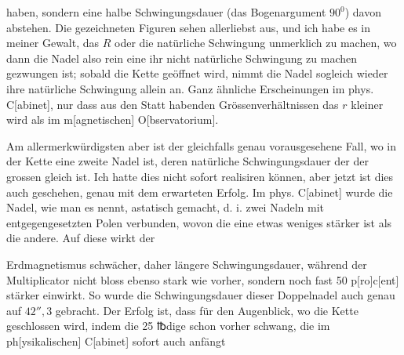 haben, sondern eine halbe Schwingungsdauer (das Bogenargument \(90^0\)) davon
abstehen. Die gezeichneten Figuren sehen allerliebst aus, und ich habe es
in meiner Gewalt, das \(R\) oder die natürliche Schwingung unmerklich zu
machen, wo dann die Nadel also rein eine ihr nicht natürliche Schwingung
zu machen gezwungen ist; sobald die Kette geöffnet wird, nimmt die Nadel
sogleich wieder ihre natürliche Schwingung allein an.
\clearpage{}\HistoricalFoot{}{13\textsuperscript{*}}
\noindent\hspace*{\parindent}Ganz ähnliche Erscheinungen im phys. C[abinet], nur dass aus den Statt
habenden Grössenverhältnissen das \(r\) kleiner wird als im m[agnetischen] O[bservatorium].

Am allermerkwürdigsten aber ist der gleichfalls genau vorausgesehene
Fall, wo in der Kette eine zweite Nadel ist, deren natürliche Schwingungsdauer
der der grossen gleich ist. Ich hatte dies nicht sofort realisiren können,
aber jetzt ist dies auch geschehen, genau mit dem erwarteten Erfolg. Im
phys. C[abinet] wurde die Nadel, wie man es nennt, astatisch gemacht,
d. i. zwei Nadeln mit entgegengesetzten Polen verbunden, wovon die eine
etwas weniges stärker ist als die andere. Auf diese wirkt der
\par\noindent\begin{minipage}[t]{.78\linewidth}
Erdmagnetismus schwächer, daher längere Schwingungsdauer,
während der Multiplicator nicht bloss ebenso stark wie vorher,
sondern noch fast 50 p[ro]c[ent] stärker einwirkt. So wurde
die Schwingungsdauer dieser Doppelnadel auch genau auf \(42''{,}3\)
gebracht. Der Erfolg ist, dass für den Augenblick, wo die
Kette geschlossen wird, indem die 25 {℔}dige schon vorher
schwang, die im ph[ysikalischen] C[abinet] sofort auch anfängt
\end{minipage}\hfill\begin{minipage}[t]{.19\linewidth}\vspace{0pt}\centering
{}\end{minipage}
